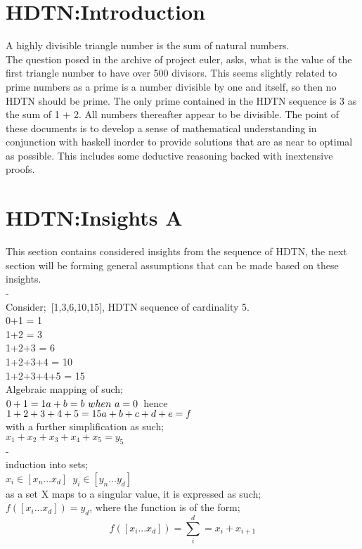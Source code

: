 \documentclass{article}
\begin{document}
\maketitle
\newpage
\section{HDTN:Introduction}
A highly divisible triangle number is the sum of natural numbers.\\
The question posed in the archive of project euler, asks, what is the value of the first triangle number to have over 500 divisors.
This seems slightly related to prime numbers as a prime is a number divisible by one and itself, so then no HDTN should be prime.
The only prime contained in the HDTN sequence is 3 as the sum of 1 + 2. All numbers thereafter appear to be divisible.
The point of these documents is to develop a sense of mathematical understanding in conjunction with haskell inorder to provide
solutions that are as near to optimal as possible. This includes some deductive reasoning backed with inextensive proofs. 

\section{HDTN:Insights A}
This section contains considered insights from the sequence of HDTN, the next section will be forming general assumptions 
that can be made based on these insights.\\
{\color{white}-}\\
Consider;\ [1,3,6,10,15], HDTN sequence of cardinality 5.\\
0+1 = 1\\
1+2 = 3\\
1+2+3 = 6\\
1+2+3+4 = 10\\
1+2+3+4+5 = 15\\
Algebraic mapping of such;\\
$0+1=1\\a+b=b\ when\ a=0$\ hence\\ $1+2+3+4+5=15\\a+b+c+d+e=f$\\ with a further simplification as such;\\
$x_1+x_2+x_3+x_4+x_5=y_5$\\
{\color{white}-}\\
induction into sets;\\
$x_i\in[x_n...x_d]$\ $y_i\in[y_n...y_d]$\\ as a set X maps to a singular value, it is expressed as such;\\
$f([x_i...x_d])=y_d$, where the function is of the form;
\begin{equation}f([x_i...x_d])=\sum_i^d=x_i+x_{i+1}\end{equation}
\newpage
\end{document}
